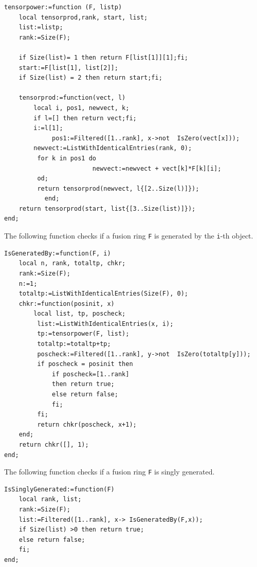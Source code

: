 \documentclass[a4paper, 10pt]{book}
\theoremstyle{definition}
\numberwithin{equation}{chapter}
\newcommand\lstl{\lstinline}
\begin{document}
\begin{lstlisting} 
tensorpower:=function (F, listp)
    local tensorprod,rank, start, list;
    list:=listp;
    rank:=Size(F);
   
    if Size(list)= 1 then return F[list[1]][1];fi;
    start:=F[list[1], list[2]]; 
    if Size(list) = 2 then return start;fi;

    tensorprod:=function(vect, l)
        local i, pos1, newvect, k;
        if l=[] then return vect;fi;
        i:=l[1];
             pos1:=Filtered([1..rank], x->not  IsZero(vect[x]));
        newvect:=ListWithIdenticalEntries(rank, 0);
         for k in pos1 do  
                        newvect:=newvect + vect[k]*F[k][i];
         od;
         return tensorprod(newvect, l{[2..Size(l)]});
           end;
    return tensorprod(start, list{[3..Size(list)]});
end;
 \end{lstlisting} 
 The following function checks if a fusion ring \lstl{F} is generated by the \lstl{i}-th object.
 \begin{lstlisting}
IsGeneratedBy:=function(F, i)
    local n, rank, totaltp, chkr;
    rank:=Size(F);
    n:=1;
    totaltp:=ListWithIdenticalEntries(Size(F), 0);
    chkr:=function(posinit, x)
        local list, tp, poscheck;
         list:=ListWithIdenticalEntries(x, i);
         tp:=tensorpower(F, list);
         totaltp:=totaltp+tp;
         poscheck:=Filtered([1..rank], y->not  IsZero(totaltp[y]));
         if poscheck = posinit then 
             if poscheck=[1..rank]
             then return true;
             else return false;
             fi;
         fi;
         return chkr(poscheck, x+1);
    end;
    return chkr([], 1);
end;
 \end{lstlisting}
The following function checks if a fusion ring \lstl{F} is singly generated.
\begin{lstlisting}
IsSinglyGenerated:=function(F)
    local rank, list;
    rank:=Size(F);
    list:=Filtered([1..rank], x-> IsGeneratedBy(F,x));
    if Size(list) >0 then return true;
    else return false;
    fi;
end;
\end{lstlisting}
\end{document}
